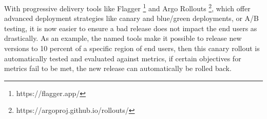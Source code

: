 With progressive delivery tools like
Flagger
\footnote{https://flagger.app/}
and
Argo Rollouts
\footnote{https://argoproj.github.io/rollouts/},
which offer advanced deployment strategies
like canary and blue/green deployments, or A/B testing,
it is now easier to ensure a bad release does not impact the end users
as drastically.
As an example, the named tools make it possible to release new versions
to 10 percent of a specific region of end users,
then this canary rollout is automatically tested and evaluated against metrics,
if certain objectives for metrics fail to be met,
the new release can automatically be rolled back.

\begin{figure}[h]
	\centering
	\begin{minipage}{.5\textwidth}
		\centering
		\label{fig:progressive-delivery}
	\end{minipage}%
	\begin{minipage}{.5\textwidth}
		\centering
		\label{fig:deploy-multiple-envs}
	\end{minipage}
\end{figure}

